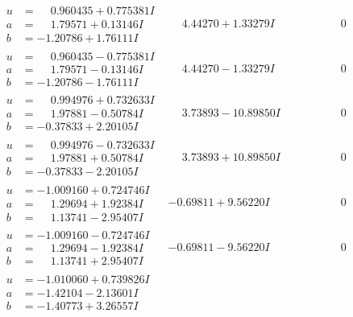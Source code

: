 \documentclass[1p]{elsarticle_modified}
\theoremstyle{definition}
\begin{document}
$$\begin{array}{c|c|c}
\begin{aligned}
u &= \phantom{-}0.960435 + 0.775381 I \\
a &= \phantom{-}1.79571 + 0.13146 I \\
b &= -1.20786 + 1.76111 I\end{aligned}
 & \phantom{-}4.44270 + 1.33279 I & \phantom{-0.000000 } 0 \\ \hline\begin{aligned}
u &= \phantom{-}0.960435 - 0.775381 I \\
a &= \phantom{-}1.79571 - 0.13146 I \\
b &= -1.20786 - 1.76111 I\end{aligned}
 & \phantom{-}4.44270 - 1.33279 I & \phantom{-0.000000 } 0 \\ \hline\begin{aligned}
u &= \phantom{-}0.994976 + 0.732633 I \\
a &= \phantom{-}1.97881 - 0.50784 I \\
b &= -0.37833 + 2.20105 I\end{aligned}
 & \phantom{-}3.73893 - 10.89850 I & \phantom{-0.000000 } 0 \\ \hline\begin{aligned}
u &= \phantom{-}0.994976 - 0.732633 I \\
a &= \phantom{-}1.97881 + 0.50784 I \\
b &= -0.37833 - 2.20105 I\end{aligned}
 & \phantom{-}3.73893 + 10.89850 I & \phantom{-0.000000 } 0 \\ \hline\begin{aligned}
u &= -1.009160 + 0.724746 I \\
a &= \phantom{-}1.29694 + 1.92384 I \\
b &= \phantom{-}1.13741 - 2.95407 I\end{aligned}
 & -0.69811 + 9.56220 I & \phantom{-0.000000 } 0 \\ \hline\begin{aligned}
u &= -1.009160 - 0.724746 I \\
a &= \phantom{-}1.29694 - 1.92384 I \\
b &= \phantom{-}1.13741 + 2.95407 I\end{aligned}
 & -0.69811 - 9.56220 I & \phantom{-0.000000 } 0 \\ \hline\begin{aligned}
u &= -1.010060 + 0.739826 I \\
a &= -1.42104 - 2.13601 I \\
b &= -1.40773 + 3.26557 I\end{aligned}

\end{array}$$
\end{document}
